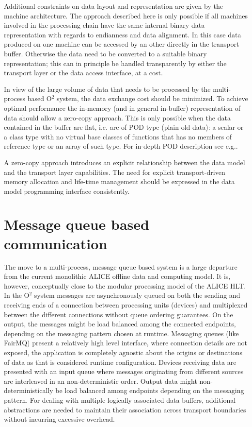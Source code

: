 \documentclass[a4paper,twoside]{article}
\def\O2{O$^2$}
\begin{document}
Additional constraints on data layout and representation are given by the machine architecture. The approach described here is only possible if all machines involved in the processing chain have the same internal binary data representation with regards to endianness and data alignment. In this case data produced on one machine can be accessed by an other directly in the transport buffer. Otherwise the data need to be converted to a suitable binary representation; this can in principle be handled transparently by either the transport layer or the data access interface, at a cost.

In view of the large volume of data that needs to be processed by the multi-process based \O2 system, the data exchange cost should be minimized. To achieve optimal performance the in-memory (and in general in-buffer) representation of data should allow a zero-copy approach. This is only possible when the data contained in the buffer are flat, i.e. are of POD type (plain old data): a scalar or a class type with no virtual base classes of functions that has no members of reference type or an array of such type. For in-depth POD description see e.g.\cite{POD}.

A zero-copy approach introduces an explicit relationship between the data model and the transport layer capabilities. The need for explicit transport-driven memory allocation and life-time management should be expressed in the data model programming interface consistently.

\section{Message queue based communication}
The move to a multi-process, message queue based system is a large departure from the current monolithic ALICE offline data and computing model. It is, however, conceptually close to the modular processing model of the ALICE HLT.
In the \O2 system messages are asynchronously queued on both the sending and receiving ends of a connection between processing units (devices) and multiplexed between the different connections without queue ordering guarantees. On the output, the messages might be load balanced among the connected endpoints, depending on the messaging pattern chosen at runtime.
Messaging queues (like FairMQ) present a relatively high level interface, where connection details are not exposed, the application is completely agnostic about the origins or destinations of data as that is considered runtime configuration.
Devices receiving data are presented with an input queue where messages originating from different sources are interleaved in an non-deterministic order. Output data might non-deterministically be load balanced among endpoints depending on the messaging pattern.
For dealing with multiple logically associated data buffers, additional abstractions are needed to maintain their association across transport boundaries without incurring excessive overhead.
\end{document}
